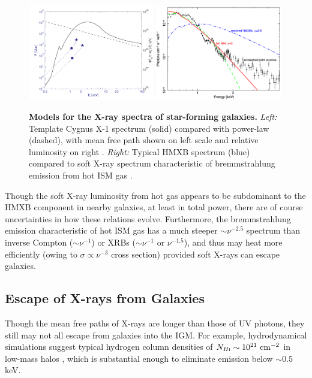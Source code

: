 \begin{figure}[]
\begin{center}
\includegraphics[width=0.49\textwidth]{Mirocha/fialkov2014_cygx1.pdf}
\includegraphics[width=0.49\textwidth]{Mirocha/pacucci2014_fig1.pdf}
\end{center}
\caption{{\bf Models for the X-ray spectra of star-forming galaxies.} \textit{Left:} Template Cygnus X-1 spectrum (solid) compared with power-law (dashed), with mean free path shown on left scale and relative luminosity on right \cite{Fialkov2014b}. \textit{Right:} Typical HMXB spectrum (blue) compared to soft X-ray spectrum characteristic of bremmstrahlung emission from hot ISM gas \cite{Pacucci2014}.}
\label{fig:xray_seds}
\end{figure}

Though the soft X-ray luminosity from hot gas appears to be subdominant to the HMXB component in nearby galaxies, at least in total power, there are of course uncertainties in how these relations evolve. Furthermore, the bremmstrahlung emission characteristic of hot ISM gas has a much steeper $\sim \nu^{-2.5}$ spectrum than inverse Compton ($\sim \nu^{-1}$) or XRBs ($\sim \nu^{-1}$ or $\nu^{-1.5}$), and thus may heat more efficiently (owing to $\sigma \propto \nu^{-3}$ cross section) provided soft X-rays can escape galaxies. 

\subsection{Escape of X-rays from Galaxies} \label{sec:xray_esc}
Though the mean free paths of X-rays are longer than those of UV photons, they still may not all escape from galaxies into the IGM. For example, hydrodynamical simulations suggest typical hydrogen column densities of $\NHI \sim 10^{21} \ \mathrm{cm}^{-2}$ in low-mass halos \cite{Das2017}, which is substantial enough to eliminate emission below $\sim 0.5$ keV. 

